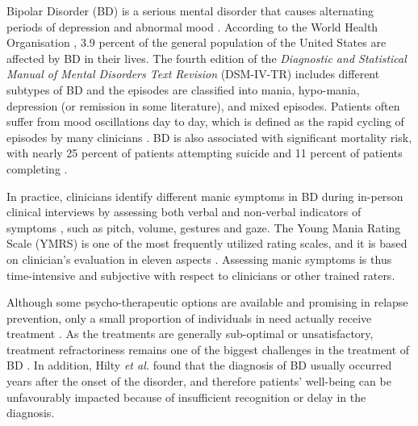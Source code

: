 
Bipolar Disorder (BD) is a serious mental disorder that causes alternating periods of depression and abnormal mood \cite{american2013}. According to the World Health Organisation \cite{world2017}, 3.9 percent of the general population of the United States are affected by BD in their lives. The fourth edition of the \textit{Diagnostic and Statistical Manual of Mental Disorders Text Revision} (DSM-IV-TR) \cite{american2000} includes different subtypes of BD and the episodes are classified into mania, hypo-mania, depression (or remission in some literature), and mixed episodes. Patients often suffer from mood oscillations day to day, which is defined as the rapid cycling of episodes by many clinicians \cite{hilty2006}. BD is also associated with significant mortality risk, with nearly 25 percent of patients attempting suicide and 11 percent of patients completing \cite{prien1990}.

In practice, clinicians identify different manic symptoms in BD during in-person clinical interviews by assessing both verbal and non-verbal indicators of symptoms \cite{hall1995, sobin1997}, such as pitch, volume, gestures and gaze. The Young Mania Rating Scale (YMRS) is one of the most frequently utilized rating scales, and it is based on clinician's evaluation in eleven aspects \cite{young1978}. Assessing manic symptoms is thus time-intensive and subjective with respect to clinicians or other trained raters.

Although some psycho-therapeutic options are available and promising in relapse prevention, only a small proportion of individuals in need actually receive treatment \cite{kazdin2011}. As the treatments are generally sub-optimal or unsatisfactory, treatment refractoriness remains one of the biggest challenges in the treatment of BD \cite{bauer2017}. In addition, Hilty \textit{et al.} \cite{hilty2006} found that the diagnosis of BD usually occurred years after the onset of the disorder, and therefore patients' well-being can be unfavourably impacted because of insufficient recognition or delay in the diagnosis.

